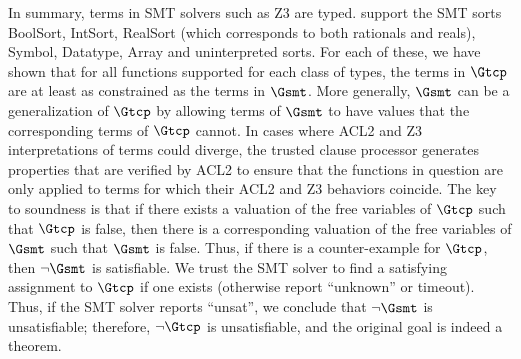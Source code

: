 In summary, terms in \acs{SMT} solvers such as Z3 are typed.  \smtlink{} support
the \acs{SMT} sorts BoolSort, IntSort, RealSort (which corresponds to both
rationals and reals), Symbol, Datatype, Array and uninterpreted sorts.
For each of these, we have shown that for all functions supported for each
class of types, the terms in $\Gtcp$ are at least as constrained as the terms in
$\Gsmt$.
More generally, $\Gsmt$ can be a generalization of $\Gtcp$ by allowing terms of
$\Gsmt$ to have values that the corresponding terms of $\Gtcp$ cannot.
In cases where ACL2 and Z3 interpretations of terms could diverge, the
trusted clause processor generates properties that are verified by ACL2 to
ensure that the functions in question are only applied to terms for which their
ACL2 and Z3 behaviors coincide.
The key to soundness is that if there exists a valuation of the free variables
of $\Gtcp$ such that $\Gtcp$ is false, then there is a corresponding valuation
of the free variables of $\Gsmt$ such that $\Gsmt$ is false.  Thus, if there
is a counter-example for $\Gtcp$, then $\neg\Gsmt$ is satisfiable.  We trust
the \acs{SMT} solver to find a satisfying assignment to $\Gtcp$ if one exists
(otherwise report ``unknown'' or timeout).  Thus, if the SMT solver reports
``unsat'', we conclude that $\neg\Gsmt$ is unsatisfiable; therefore, $\neg\Gtcp$
is unsatisfiable, and the original goal is indeed a theorem.

\endinput
